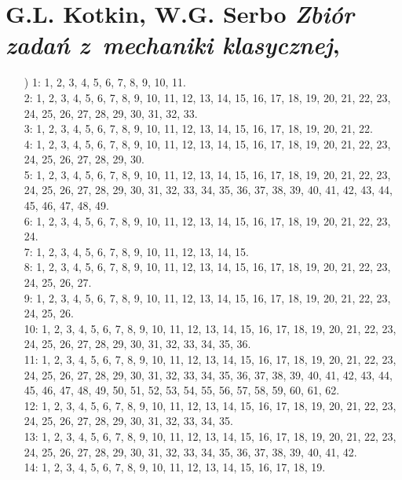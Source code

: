 \documentclass[a4paper,11pt]{article}
\numberwithin{equation}{section}
\begin{document}
\section{G.L. Kotkin, W.G. Serbo \textit{Zbiór zadań
    z~mechaniki klasycznej}, %
}

\label{sec:Oznaczenia-i-konwencje}


\begin{itemize}

\item[\romannumeral1)] 1: 1, 2, 3, 4, 5, 6, 7, 8, 9, 10, 11. \\
  2: 1, 2, 3, 4, 5, 6, 7, 8, 9, 10, 11, 12, 13, 14, 15, 16, 17, 18, 19, 20,
  21, 22, 23, 24, 25, 26, 27, 28, 29, 30, 31, 32, 33. \\
  3: 1, 2, 3, 4, 5, 6, 7, 8, 9, 10, 11, 12, 13, 14, 15, 16, 17, 18, 19, 20,
  21, 22. \\
  4: 1, 2, 3, 4, 5, 6, 7, 8, 9, 10, 11, 12, 13, 14, 15, 16, 17, 18, 19, 20,
  21, 22, 23, 24, 25, 26, 27, 28, 29, 30. \\
  5: 1, 2, 3, 4, 5, 6, 7, 8, 9, 10, 11, 12, 13, 14, 15, 16, 17, 18, 19, 20,
  21, 22, 23, 24, 25, 26, 27, 28, 29, 30, 31, 32, 33, 34, 35, 36, 37, 38,
  39, 40, 41, 42, 43, 44, 45, 46, 47, 48, 49. \\
  6: 1, 2, 3, 4, 5, 6, 7, 8, 9, 10, 11, 12, 13, 14, 15, 16, 17, 18, 19, 20,
  21, 22, 23, 24. \\
  7: 1, 2, 3, 4, 5, 6, 7, 8, 9, 10, 11, 12, 13, 14, 15. \\
  8: 1, 2, 3, 4, 5, 6, 7, 8, 9, 10, 11, 12, 13, 14, 15, 16, 17, 18, 19, 20,
  21, 22, 23, 24, 25, 26, 27. \\
  9: 1, 2, 3, 4, 5, 6, 7, 8, 9, 10, 11, 12, 13, 14, 15, 16, 17, 18, 19, 20,
  21, 22, 23, 24, 25, 26. \\
  10: 1, 2, 3, 4, 5, 6, 7, 8, 9, 10, 11, 12, 13, 14, 15, 16, 17, 18, 19, 20,
  21, 22, 23, 24, 25, 26, 27, 28, 29, 30, 31, 32, 33, 34, 35, 36. \\
  11: 1, 2, 3, 4, 5, 6, 7, 8, 9, 10, 11, 12, 13, 14, 15, 16, 17, 18, 19, 20,
  21, 22, 23, 24, 25, 26, 27, 28, 29, 30, 31, 32, 33, 34, 35, 36, 37, 38,
  39, 40, 41, 42, 43, 44, 45, 46, 47, 48, 49, 50, 51, 52, 53, 54, 55, 56,
  57, 58, 59, 60, 61, 62. \\
  12: 1, 2, 3, 4, 5, 6, 7, 8, 9, 10, 11, 12, 13, 14, 15, 16, 17, 18, 19, 20,
  21, 22, 23, 24, 25, 26, 27, 28, 29, 30, 31, 32, 33, 34, 35. \\
  13: 1, 2, 3, 4, 5, 6, 7, 8, 9, 10, 11, 12, 13, 14, 15, 16, 17, 18, 19, 20,
  21, 22, 23, 24, 25, 26, 27, 28, 29, 30, 31, 32, 33, 34, 35, 36, 37, 38,
  39, 40, 41, 42. \\
  14: 1, 2, 3, 4, 5, 6, 7, 8, 9, 10, 11, 12, 13, 14, 15, 16, 17, 18, 19.


\end{itemize}
\end{document}
